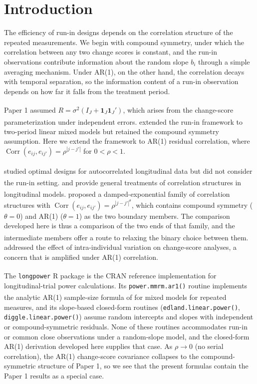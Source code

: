 \documentclass[
  11pt,
]{article}
\begin{document}
\section{Introduction}\label{introduction}

The efficiency of run-in designs depends on the
correlation structure of the repeated measurements. We
begin with compound symmetry, under which the
correlation between any two change scores is constant,
and the run-in observations contribute information
about the random slope \(b_i\) through a simple averaging
mechanism. Under AR(1), on the other hand, the
correlation decays with temporal separation, so the
information content of a run-in observation depends on
how far it falls from the treatment period.

Paper 1\textsuperscript{} assumed \(R = \sigma^2(I_J +
\mathbf{1}_J\mathbf{1}_J')\), which arises from the
change-score parameterization under independent errors.\textsuperscript{} extended the run-in framework to two-period
linear mixed models but retained the compound symmetry
assumption. Here we extend the framework to AR(1)
residual correlation, where \(\mathop{\mathrm{Corr}}(e_{ij}, e_{ij'}) =
\rho^{|j-j'|}\) for \(0 < \rho < 1\).

\textsuperscript{} studied optimal designs for autocorrelated
longitudinal data but did not consider the run-in
setting.\textsuperscript{} and\textsuperscript{} provide general
treatments of correlation structures in longitudinal
models.\textsuperscript{} proposed a damped-exponential family
of correlation structures with \(\mathop{\mathrm{Corr}}(e_{ij}, e_{ij'}) =
\rho^{|j-j'|^{\theta}}\), which contains compound symmetry
(\(\theta = 0\)) and AR(1) (\(\theta = 1\)) as the two
boundary members. The comparison developed here is thus
a comparison of the two ends of that family, and the
intermediate members offer a route to relaxing the
binary choice between them.\textsuperscript{} addressed the
effect of intra-individual variation on change-score
analyses, a concern that is amplified under AR(1)
correlation.

The \texttt{longpower} R package\textsuperscript{} is the CRAN
reference implementation for longitudinal-trial power
calculations. Its \texttt{power.mmrm.ar1()} routine implements
the analytic AR(1) sample-size formula of\textsuperscript{} for
mixed models for repeated measures, and its slope-based
closed-form routines (\texttt{edland.linear.power()},
\texttt{diggle.linear.power()}) assume random intercepts and
slopes with independent or compound-symmetric residuals.
None of these routines accommodates run-in or common
close observations under a random-slope model, and the
closed-form AR(1) derivation developed here supplies
that case. As \(\rho \to 0\) (no serial correlation), the
AR(1) change-score covariance collapses to the
compound-symmetric structure of Paper 1, so we see that
the present formulas contain the Paper 1 results as a
special case.
\end{document}
